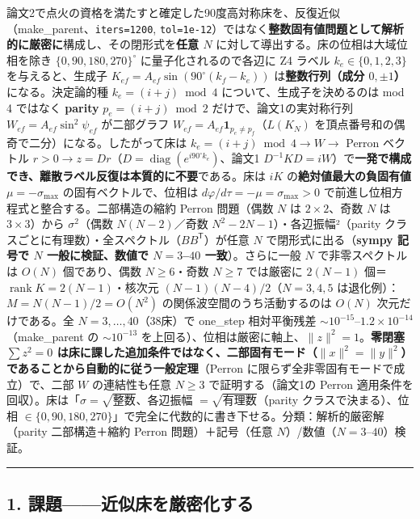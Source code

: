 \documentclass[
  a4paper,
]{ltjsarticle}
\begin{document}
論文2で点火の資格を満たすと確定した90度高対称床を、反復近似（make\_parent、\texttt{iters=1200},
\texttt{tol=1e-12}）ではなく\textbf{整数固有値問題として解析的に厳密に}構成し、その閉形式を\textbf{任意
\(N\)} に対して導出する。床の位相は大域位相を除き
\(\{0,90,180,270\}^\circ\) に量子化されるので各辺に Z4 ラベル
\(k_e\in\{0,1,2,3\}\) を与えると、生成子
\(K_{ef}=A_{ef}\sin(90^\circ(k_f-k_e))\) は\textbf{整数行列（成分
\(0,\pm1\)）}になる。決定論的種 \(k_e=(i+j)\bmod4\)
について、生成子を決めるのは mod 4 ではなく \textbf{parity}
\(p_e=(i+j)\bmod2\) だけで、論文1の実対称行列
\(W_{ef}=A_{ef}\sin^2\psi_{ef}\) が二部グラフ
\(W_{ef}=A_{ef}\mathbf 1_{p_e\neq p_f}\)（\(L(K_N)\)
を頂点番号和の偶奇で二分）になる。したがって床は
\(k_e=(i+j)\bmod4\to W\to\) Perron ベクトル
\(r>0\to z=Dr\)（\(D=\operatorname{diag}(e^{i90^\circ k_e})\)、論文1
\(D^{-1}KD=iW\)）で\textbf{一発で構成でき、離散ラベル反復は本質的に不要}である。床は
\(iK\) の\textbf{絶対値最大の負固有値} \(\mu=-\sigma_{\max}\)
の固有ベクトルで、位相は \(d\varphi/d\tau=-\mu=\sigma_{\max}>0\)
で前進し位相方程式と整合する。二部構造の縮約 Perron 問題（偶数 \(N\) は
\(2\times2\)、奇数 \(N\) は \(3\times3\)）から \(\sigma^2\)（偶数
\(N(N-2)\)／奇数 \(N^2-2N-1\)）・各辺振幅²（parity
クラスごとに有理数）・全スペクトル（\(BB^{\mathsf T}\)）が任意 \(N\)
で閉形式に出る（\textbf{sympy 記号で \(N\) 一般に検証、数値で
\(N=3\)--\(40\) 一致}）。さらに一般 \(N\) で非零スペクトルは \(O(N)\)
個であり、偶数 \(N\ge6\)・奇数 \(N\ge7\) では厳密に \(2(N-1)\)
個＝\(\operatorname{rank}K=2(N-1)\)・核次元
\((N-1)(N-4)/2\)（\(N=3,4,5\) は退化例）：\(M=N(N-1)/2=O(N^2)\)
の関係波空間のうち活動するのは \(O(N)\) 次元だけである。全
\(N=3,\ldots,40\)（38床）で one\_step 相対平衡残差
\(\sim10^{-15}\)--\(1.2\times10^{-14}\)（make\_parent の
\(\sim10^{-13}\)
を上回る）、位相は厳密に軸上、\(\|z\|^2=1\)。\textbf{零閉塞
\(\sum z^2=0\)
は床に課した追加条件ではなく、二部固有モード（\(\|x\|^2=\|y\|^2\)）であることから自動的に従う一般定理}（Perron
に限らず全非零固有モードで成立）で、二部 \(W\) の連結性も任意 \(N\ge3\)
で証明する（論文1の Perron
適用条件を回収）。床は「\(\sigma=\sqrt{\text{整数}}\)、各辺振幅
\(=\sqrt{\text{有理数}}\)（parity クラスで決まる）、位相
\(\in\{0,90,180,270\}\)」で完全に代数的に書き下せる。分類：解析的厳密解（parity
二部構造＋縮約 Perron 問題）＋記号（任意
\(N\)）/数値（\(N=3\)--\(40\)）検証。

\begin{center}\rule{0.5\linewidth}{0.5pt}\end{center}

\subsection{1.
課題------近似床を厳密化する}\label{ux8ab2ux984cux8fd1ux4f3cux5e8aux3092ux53b3ux5bc6ux5316ux3059ux308b}
\end{document}
